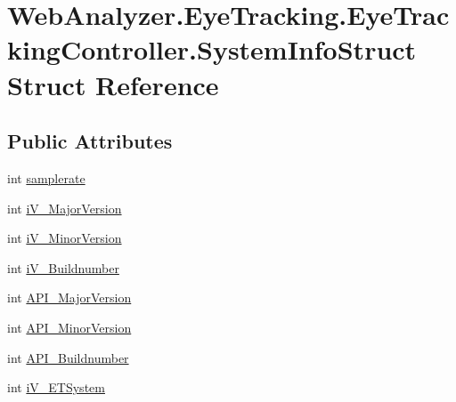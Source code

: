 \hypertarget{struct_web_analyzer_1_1_eye_tracking_1_1_eye_tracking_controller_1_1_system_info_struct}{}\section{Web\+Analyzer.\+Eye\+Tracking.\+Eye\+Tracking\+Controller.\+System\+Info\+Struct Struct Reference}
\label{struct_web_analyzer_1_1_eye_tracking_1_1_eye_tracking_controller_1_1_system_info_struct}
\subsection*{Public Attributes}
\begin{DoxyCompactItemize}
\item 
int \hyperlink{struct_web_analyzer_1_1_eye_tracking_1_1_eye_tracking_controller_1_1_system_info_struct_ad01eaf2951431e56461a816f587d5957}{samplerate}
\item 
int \hyperlink{struct_web_analyzer_1_1_eye_tracking_1_1_eye_tracking_controller_1_1_system_info_struct_ab64555809b3f5e516a6248565ee79ac7}{i\+V\+\_\+\+Major\+Version}
\item 
int \hyperlink{struct_web_analyzer_1_1_eye_tracking_1_1_eye_tracking_controller_1_1_system_info_struct_ab19d06d21510b7f2bc3c3bd181abe574}{i\+V\+\_\+\+Minor\+Version}
\item 
int \hyperlink{struct_web_analyzer_1_1_eye_tracking_1_1_eye_tracking_controller_1_1_system_info_struct_ad0f2f37105684576f8cdda148d95e7e6}{i\+V\+\_\+\+Buildnumber}
\item 
int \hyperlink{struct_web_analyzer_1_1_eye_tracking_1_1_eye_tracking_controller_1_1_system_info_struct_a7148791f8fe6f4b0ada463c56a2e7c45}{A\+P\+I\+\_\+\+Major\+Version}
\item 
int \hyperlink{struct_web_analyzer_1_1_eye_tracking_1_1_eye_tracking_controller_1_1_system_info_struct_af2f7219b536721705ade198477ae2eae}{A\+P\+I\+\_\+\+Minor\+Version}
\item 
int \hyperlink{struct_web_analyzer_1_1_eye_tracking_1_1_eye_tracking_controller_1_1_system_info_struct_a3ac6efe197b8764eb8bd11a37bbfb0b0}{A\+P\+I\+\_\+\+Buildnumber}
\item 
int \hyperlink{struct_web_analyzer_1_1_eye_tracking_1_1_eye_tracking_controller_1_1_system_info_struct_aa2c2f0836b84ebb7774f0925fc88f70d}{i\+V\+\_\+\+E\+T\+System}
\end{DoxyCompactItemize}


